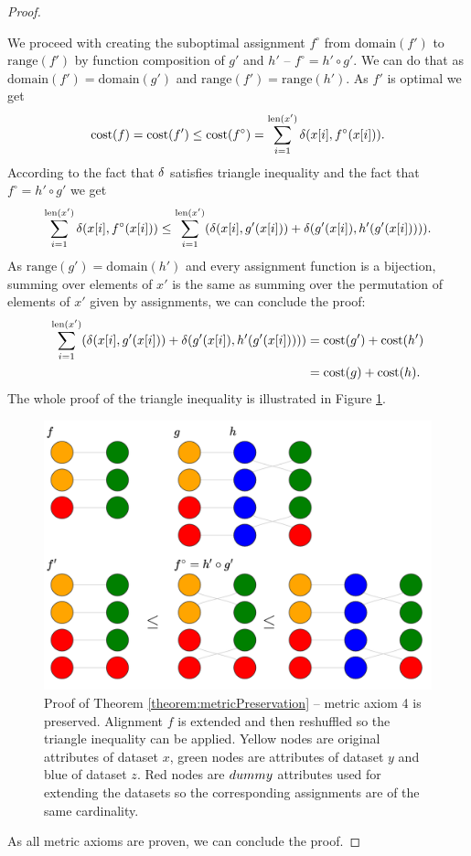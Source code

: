 \begin{theorem}
\begin{proof}
\begin{enumerate}
		We proceed with creating the suboptimal assignment $f^\circ$ from $\text{domain}(f')$ to $\text{range}(f')$ by function composition of $g'$ and $h'$ -- $f^\circ=h'\circ g'$. We can do that as $\text{domain}(f')=\text{domain}(g')$ and $\text{range}(f')=\text{range}(h')$. As $f'$ is optimal we get 
		$$\text{cost}(f)=\text{cost}(f') \le \text{cost}(f^\circ)=
		\sum_{i=1}^{\text{len}(x')}\delta(x[i],f^\circ(x[i])).$$ 
		According to the fact that $\delta$ satisfies triangle inequality and the fact that $f^\circ=h'\circ g'$ we get
		$$\sum_{i=1}^{\text{len}(x')}\delta(x[i],f^\circ (x[i])) \le 
		\sum_{i=1}^{\text{len}(x')}(\delta(x[i],g'(x[i]))+ \delta(g'(x[i]),h'(g'(x[i])))).$$
		As $\text{range}(g')=\text{domain}(h')$ and every assignment function is a bijection, summing over elements of $x'$ is the same as summing over the permutation of elements of $x'$ given by assignments, we can conclude the proof:
		\begin{align*}
		\sum_{i=1}^{\text{len}(x')}(\delta(x[i],g'(x[i]))+ \delta(g'(x[i]),h'(g'(x[i]))))&=\text{cost}(g')+\text{cost}(h') \\
		& =\text{cost}(g)+\text{cost}(h).
		\end{align*}			 
		The whole proof of the triangle inequality is illustrated in Figure \ref{fig:metricPreservation}. 
		\begin{figure}	
			\includegraphics[width=14cm]{Images/metricPreservation.png}
			\centering
			\caption{Proof of Theorem \ref{theorem:metricPreservation} -- metric axiom 4 is preserved. Alignment $f$ is extended and then reshuffled so the triangle inequality can be applied. Yellow nodes are original attributes of dataset $x$, green nodes are attributes of dataset $y$ and blue of dataset $z$. Red nodes are $dummy$ attributes used for extending the datasets so the corresponding assignments are of the same cardinality.}	
			\label{fig:metricPreservation}	
		\end{figure}
	\end{enumerate} 	
	As all metric axioms are proven, we can conclude the proof.	
	\end{proof}
\end{theorem}

